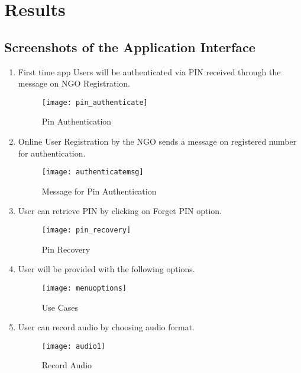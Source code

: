 \chapter{Results}

\section{Screenshots of the Application Interface}

\begin {enumerate}
\item First time app Users will be authenticated via PIN received through the message on NGO Registration.
\begin{figure}[here]
\begin{center}   
\texttt{[image: pin\_authenticate]}
\caption{Pin Authentication}
\label{fig:pin_authenticate}
\end{center}
\end{figure}

\item Online User Registration by the NGO sends a message on registered number for authentication.
\begin{figure}[here]
\begin{center}   
\texttt{[image: authenticatemsg]}
\caption{Message for Pin Authentication}
\label{fig:authenticatemsg}
\end{center}
\end{figure}

\item User can retrieve PIN by clicking on Forget PIN option.
\begin{figure}[here]
\begin{center}   
\texttt{[image: pin\_recovery]}
\caption{Pin Recovery}
\label{fig:pin_recovery}
\end{center}
\end{figure}

\item User will be provided with the following options.
\begin{figure}[here]
\begin{center}   
\texttt{[image: menuoptions]}
\caption{Use Cases}
\label{fig:menuoptions}
\end{center}
\end{figure}

\item User can record audio by choosing audio format.
\begin{figure}[here]
\begin{center}   
\texttt{[image: audio1]}
\caption{Record Audio}
\label{fig:audio1}
\end{center}
\end{figure}


\end{enumerate}
